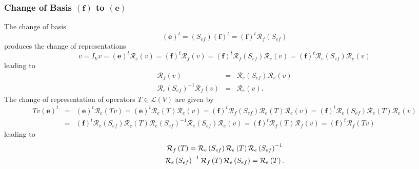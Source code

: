 \documentclass[aps,preprint]{revtex4}
\begin{document}
\subsubsection{Change of Basis $\left( \boldsymbol{f}\right) $ to $\left( 
\boldsymbol{e}\right) $}

The change of basis 
\begin{equation}
\left( \boldsymbol{e}\right) ^{t}=\left( S_{ef}\right) \left( \boldsymbol{f}%
\right) ^{t}=\left( \boldsymbol{f}\right) ^{t}\mathcal{R}_{f}\left(
S_{ef}\right)
\end{equation}%
produces the change of representations 
\begin{equation}
v=I_{V}v=\left( \boldsymbol{e}\right) ^{t}\mathcal{R}_{e}\left( v\right)
=\left( \boldsymbol{f}\right) ^{t}\mathcal{R}_{f}\left( v\right) =\left( 
\boldsymbol{f}\right) ^{t}\mathcal{R}_{f}\left( S_{ef}\right) \mathcal{R}%
_{e}\left( v\right) =\left( \boldsymbol{f}\right) ^{t}\mathcal{R}_{e}\left(
S_{ef}\right) \mathcal{R}_{e}\left( v\right)
\end{equation}%
leading to 
\begin{eqnarray}
\mathcal{R}_{f}\left( v\right) &=&\mathcal{R}_{e}\left( S_{ef}\right) 
\mathcal{R}_{e}\left( v\right) \\
\mathcal{R}_{e}\left( S_{ef}\right) ^{-1}\mathcal{R}_{f}\left( v\right) &=&%
\mathcal{R}_{e}\left( v\right) .
\end{eqnarray}%
The change of representation of operators $T\in \mathcal{L}\left( V\right) $
are given by 
\begin{eqnarray}
Tv\left( \boldsymbol{e}\right) ^{t} &=&\left( \boldsymbol{e}\right) ^{t}%
\mathcal{R}_{e}\left( Tv\right) =\left( \boldsymbol{e}\right) ^{t}\mathcal{R}%
_{e}\left( T\right) \mathcal{R}_{e}\left( v\right) =\left( \boldsymbol{f}%
\right) ^{t}\mathcal{R}_{f}\left( S_{ef}\right) \mathcal{R}_{e}\left(
T\right) \mathcal{R}_{e}\left( v\right) =\left( \boldsymbol{f}\right) ^{t}%
\mathcal{R}_{e}\left( S_{ef}\right) \mathcal{R}_{e}\left( T\right) \mathcal{R%
}_{e}\left( v\right) \\
&=&\left( \boldsymbol{f}\right) ^{t}\mathcal{R}_{e}\left( S_{ef}\right) 
\mathcal{R}_{e}\left( T\right) \mathcal{R}_{e}\left( S_{ef}\right) ^{-1}%
\mathcal{R}_{e}\left( S_{ef}\right) \mathcal{R}_{e}\left( v\right) =\left( 
\boldsymbol{f}\right) ^{t}\mathcal{R}_{f}\left( T\right) \mathcal{R}%
_{f}\left( v\right) =\left( \boldsymbol{f}\right) ^{t}\mathcal{R}_{f}\left(
Tv\right)
\end{eqnarray}%
leading to 
\begin{gather}
\mathcal{R}_{f}\left( T\right) =\mathcal{R}_{e}\left( S_{ef}\right) \mathcal{%
R}_{e}\left( T\right) \mathcal{R}_{e}\left( S_{ef}\right) ^{-1} \\
\mathcal{R}_{e}\left( S_{ef}\right) ^{-1}\mathcal{R}_{f}\left( T\right) 
\mathcal{R}_{e}\left( S_{ef}\right) =\mathcal{R}_{e}\left( T\right) .
\end{gather}
\end{document}
